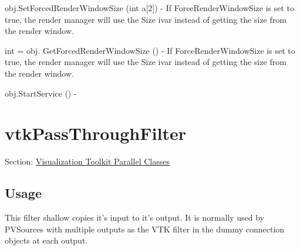 \begin{DoxyItemize}
\item {\ttfamily obj.\-Set\-Forced\-Render\-Window\-Size (int a\mbox{[}2\mbox{]})} -\/ If Force\-Render\-Window\-Size is set to true, the render manager will use the Size ivar instead of getting the size from the render window.  
\item {\ttfamily int = obj. Get\-Forced\-Render\-Window\-Size ()} -\/ If Force\-Render\-Window\-Size is set to true, the render manager will use the Size ivar instead of getting the size from the render window.  
\item {\ttfamily obj.\-Start\-Service ()} -\/  
\end{DoxyItemize}\hypertarget{vtkparallel_vtkpassthroughfilter}{}\section{vtk\-Pass\-Through\-Filter}\label{vtkparallel_vtkpassthroughfilter}
Section\-: \hyperlink{sec_vtkparallel}{Visualization Toolkit Parallel Classes} \hypertarget{vtkwidgets_vtkxyplotwidget_Usage}{}\subsection{Usage}\label{vtkwidgets_vtkxyplotwidget_Usage}
This filter shallow copies it's input to it's output. It is normally used by P\-V\-Sources with multiple outputs as the V\-T\-K filter in the dummy connection objects at each output.

